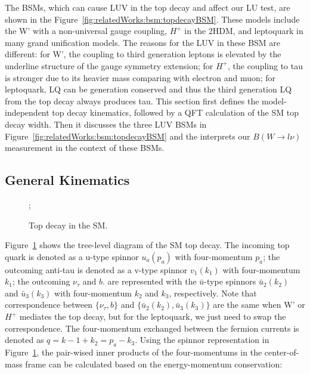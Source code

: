 The BSMs, which can cause LUV in the top decay and affect our LU test, are shown in the Figure~\ref{fig:relatedWorks:bsm:topdecayBSM}. These models include the W' with a non-universal gauge coupling, $H^+$ in the 2HDM, and leptoquark in many grand unification models. The reasons for the LUV in these BSM are different: for W', the coupling to third generation leptons is elevated by the underline structure of the gauge symmetry extension; for $H^+$, the coupling to tau is stronger due to its heavier mass comparing with electron and muon; for leptoquark, LQ can be generation conserved and thus the third generation LQ from the top decay always produces tau. This section first defines the model-independent top decay kinematics, followed by a QFT calculation of the SM top decay width. Then it discusses the three LUV BSMs in Figure~\ref{fig:relatedWorks:bsm:topdecayBSM} and the interprets our $B(W\to l \nu )$ measurement in the context of these BSMs.



\subsection{General Kinematics}
\label{sec:relatedWorks:bsm:kinematics}

\begin{figure}[ht]
    \centering
    ;
    \caption{Top decay in the SM.}
    \label{fig:relatedWorks:bsm:topdecaySM}
\end{figure}

Figure~\ref{fig:relatedWorks:bsm:topdecaySM} shows the tree-level diagram of the SM top decay. The incoming top quark is denoted as a u-type spinnor $u_a(p_a)$ with four-momentum $p_a$; the outcoming anti-tau is denoted as a v-type spinnor $v_1(k_1)$ with four-momentum $k_1$; the outcoming  $\nu_\tau$ and $b$. are represented with the $\bar{u}$-type spinnors $\bar{u}_2(k_2)$ and $\bar{u}_3(k_3)$ with four-momentum $k_2$ and $k_3$, respectively. Note that correspondence between  $\{\nu_\tau,b\}$ and $\{ \bar{u}_2(k_2), \bar{u}_3(k_3)\}$ are the same when W' or $H^+$ mediates the top decay, but for the leptoquark, we just need to swap the correspondence. The four-momentum exchanged between the fermion currents is denoted as $q=k-1+k_2 = p_a - k_3$. Using the spinnor representation in Figure~\ref{fig:relatedWorks:bsm:topdecaySM}, the pair-wised inner products of the four-momentums in the center-of-mass frame can be calculated based on the energy-momentum conservation:
 
